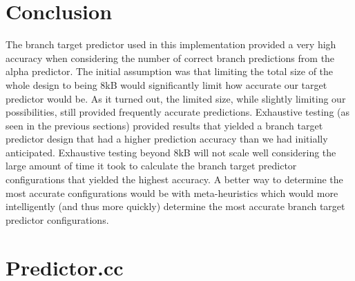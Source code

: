\documentclass[twocolumn]{article}
\begin{document}
\section{Conclusion}
The branch target predictor used in this implementation provided 
a very high accuracy when considering the number of correct 
branch predictions from the alpha predictor. The initial assumption
was that limiting the total size of the whole design to being 8kB
would significantly limit how accurate our target predictor would be.
As it turned out, the limited size, while slightly limiting our 
possibilities, still provided frequently accurate predictions.
Exhaustive testing (as seen in the previous sections) provided 
results that yielded a branch target predictor design that 
had a higher prediction accuracy than we had initially anticipated.
Exhaustive testing beyond 8kB will not scale well considering the 
large amount of time it took to calculate the branch target 
predictor configurations that yielded the highest accuracy.
A better way to determine the most accurate configurations would 
be with meta-heuristics which would more intelligently (and thus 
more quickly) determine the most accurate branch target predictor 
configurations.


\newpage
\onecolumn
\appendix
\section{Predictor.cc}

\end{document}
